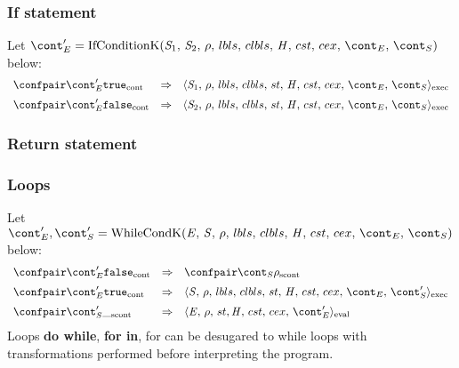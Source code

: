 \documentclass{article}
\begin{document}
\subsubsection{If statement}

Let $\econt' = \IfCondK{\stmti{1}}{\stmti{2}}$ below:
\[
  \begin{array}{lcl}
	\contconf{\econt'}{\true}
	& \Rightarrow &
	\execconf{\stmti{1}}{\env}{\lbls}{\clbls}{\handler}{\cstrace}{\cex}{\econt}{\scont}\\[2mm]

	\contconf{\econt'}{\false}
	& \Rightarrow &
	\execconf{\stmti{2}}{\env}{\lbls}{\clbls}{\handler}{\cstrace}{\cex}{\econt}{\scont}\\
  \end{array}
\]

\subsubsection{Return statement}

\subsubsection{Loops}
Let $\econt', \scont' = \whilecondk$ below:
\[
  \begin{array}{lcl}
	\contconf{\econt'}{\false}
	& \Rightarrow &
	\scontconf{\scont}{\env}\\[2mm]

	\contconf{\econt'}{\true}
	& \Rightarrow &
	\execconf{\stmt}{\env}{\lbls}{\clbls}{\handler}{\cstrace}{\cex}{\econt}{\scont'}\\[2mm]

	\scontconf{\scont'}{\_}
	& \Rightarrow &
	\evalconf{\expr}{\env}{\strace}{\cstrace}{\cex}{\econt'}\\
  \end{array}
\]
Loops \textbf{do while}, \textbf{for in}, for can be desugared to while loops with transformations performed before interpreting the program.
\end{document}
